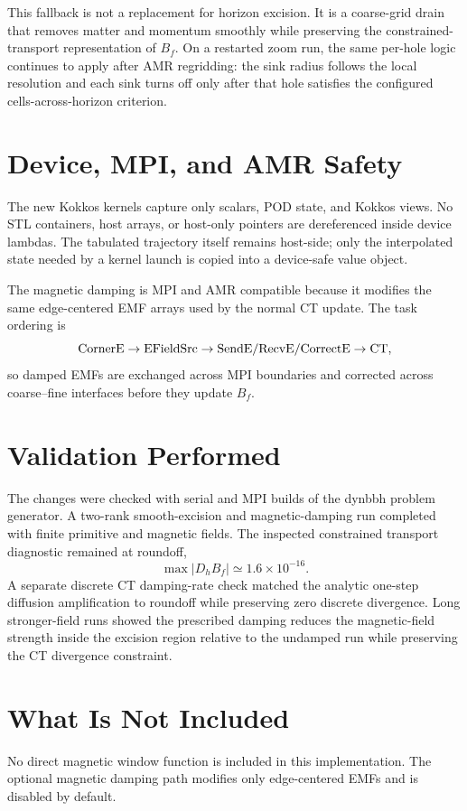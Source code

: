 \documentclass[11pt]{article}
\begin{document}
This fallback is not a replacement for horizon excision.  It is a coarse-grid
drain that removes matter and momentum smoothly while preserving the
constrained-transport representation of \(B_f\).  On a restarted zoom run, the
same per-hole logic continues to apply after AMR regridding: the sink radius
follows the local resolution and each sink turns off only after that hole
satisfies the configured cells-across-horizon criterion.

\section{Device, MPI, and AMR Safety}

The new Kokkos kernels capture only scalars, POD state, and Kokkos views.
No STL containers, host arrays, or host-only pointers are dereferenced inside
device lambdas.  The tabulated trajectory itself remains host-side; only the
interpolated state needed by a kernel launch is copied into a device-safe
value object.

The magnetic damping is MPI and AMR compatible because it modifies the same
edge-centered EMF arrays used by the normal CT update.  The task ordering is
\begin{equation}
  {\rm CornerE}
  \rightarrow
  {\rm EFieldSrc}
  \rightarrow
  {\rm SendE/RecvE/CorrectE}
  \rightarrow
  {\rm CT},
\end{equation}
so damped EMFs are exchanged across MPI boundaries and corrected across
coarse--fine interfaces before they update \(B_f\).

\section{Validation Performed}

The changes were checked with serial and MPI builds of the dynbbh problem
generator.  A two-rank smooth-excision and magnetic-damping run completed
with finite primitive and magnetic fields.  The inspected constrained
transport diagnostic remained at roundoff,
\begin{equation}
  \max |D_h B_f| \simeq 1.6\times 10^{-16}.
\end{equation}
A separate discrete CT damping-rate check matched the analytic one-step
diffusion amplification to roundoff while preserving zero discrete
divergence.  Long stronger-field runs showed the prescribed damping reduces
the magnetic-field strength inside the excision region relative to the
undamped run while preserving the CT divergence constraint.

\section{What Is Not Included}

No direct magnetic window function is included in this implementation.  The
optional magnetic damping path modifies only edge-centered EMFs and is disabled
by default.
\end{document}
